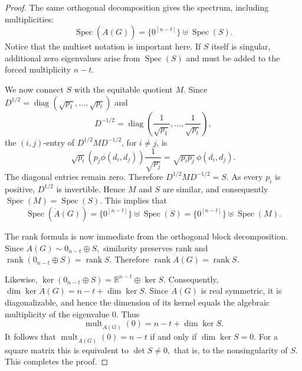 \documentclass[10pt,a4paper]{amsart}
\newcommand{\spec}{\operatorname{Spec}}
\begin{document}
\begin{proof}
	The same orthogonal decomposition gives the spectrum, including multiplicities:
	$$
	\spec(\dot A(G))
	=
	\{0^{[n-t]}\}\uplus\spec(S).
	$$
	Notice that the multiset notation is important here. If $S$ itself is singular, additional zero eigenvalues arise from $\spec(S)$ and must be added to the forced multiplicity $n-t$.
	
	We now connect $S$ with the equitable quotient $M$. Since
	$
	D^{1/2}
	=
	\operatorname{diag}(\sqrt{p_1},\ldots,\sqrt{p_t})
	$
	and
	$$
	D^{-1/2}
	=
	\operatorname{diag}
	\left(
	\frac{1}{\sqrt{p_1}},\ldots,
	\frac{1}{\sqrt{p_t}}
	\right),
	$$
	the $(i,j)$-entry of $D^{1/2}MD^{-1/2}$, for $i\neq j$, is
	$$
	\sqrt{p_i}
	\left(
	p_j\phi(d_i,d_j)
	\right)
	\frac{1}{\sqrt{p_j}}
	=
	\sqrt{p_ip_j}\,\phi(d_i,d_j).
	$$
	The diagonal entries remain zero. Therefore
	$
	D^{1/2}MD^{-1/2}=S.
	$
	As every $p_i$ is positive, $D^{1/2}$ is invertible. Hence $M$ and $S$ are similar, and consequently
	$
	\spec(M)=\spec(S).
	$
	This implies that
	$$
	\spec(\dot A(G))
	=
	\{0^{[n-t]}\}\uplus\spec(S)
	=
	\{0^{[n-t]}\}\uplus\spec(M).
	$$
	
	The rank formula is now immediate from the orthogonal block decomposition. Since
	$
	\dot A(G)\sim 0_{n-t}\oplus S,
	$
	similarity preserves rank and
	$
	\operatorname{rank}(0_{n-t}\oplus S)
	=
	\operatorname{rank}S.
	$
	Therefore
	$
	\operatorname{rank}\dot A(G)
	=
	\operatorname{rank}S.
	$
	
	Likewise,
	$
	\ker(0_{n-t}\oplus S)
	=
	\mathbb R^{n-t}\oplus\ker S.
	$
	Consequently,
	$
	\dim\ker\dot A(G)
	=
	n-t+\dim\ker S.
	$
	Since $\dot A(G)$ is real symmetric, it is diagonalizable, and hence the dimension of its kernel equals the algebraic multiplicity of the eigenvalue $0$. Thus
	$$
	\operatorname{mult}_{\dot A(G)}(0)
	=
	n-t+\dim\ker S.
	$$
	It follows that
	$
	\operatorname{mult}_{\dot A(G)}(0)=n-t
	$
	if and only if
	$
	\dim\ker S=0.
	$
	For a square matrix this is equivalent to
	$
	\det S\neq0,
	$
	that is, to the nonsingularity of $S$. This completes the proof.
\end{proof}
\end{document}
